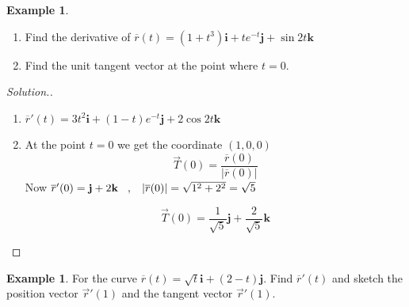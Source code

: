 \documentclass[11pt,a4paper]{article}
\theoremstyle{definition}
\newtheorem{exa}[thm]{Example}
\newenvironment{solution}
  {\renewcommand{\qedsymbol}{}\begin{proof}[\textit{Solution}.]}
  {\end{proof}}
\begin{document}
\begin{exa}
\begin{enumerate}
\item Find the derivative of $\overline{r}(t) = (1 + t^3)\textbf{i} +\displaystyle{ te^{-t}\textbf{j}} + \sin 2t \textbf{k}$
\item Find the unit tangent vector at the point where $t = 0$.
\end{enumerate}
\end{exa}

\begin{solution}
\begin{enumerate}
\item $\displaystyle{\overline{r}'(t) = 3t^2\textbf{i} + (1-t)e^{-t}\textbf{j} + 2\cos 2t \textbf{k}}$
\item At the point $t = 0$ we get the coordinate $(1,0,0)$
$$\displaystyle{\overrightarrow{T}(0) = \frac{\overline{r}(0)}{\left|\overline{r}(0)\right|
}}$$ 
Now $\overline{r}'(0) = \textbf{j} + 2\textbf{k}\hspace{0.3cm}, \hspace{0.3cm} \left|\overline{r}(0)\right| = \sqrt{1^2 + 2^2} = \sqrt{5}$

$$\overrightarrow{T}(0) = \frac{1}{\sqrt{5}}\textbf{j} + \frac{2}{\sqrt{5}}\textbf{k}$$
\end{enumerate}
\end{solution}

\begin{exa}


For the curve $\overline{r}(t) = \sqrt{t}\textbf{i} + (2 - t)\textbf{j}$. Find $\overline{r}'(t)$ and sketch the position vector $\overrightarrow{r}'(1)$ and the tangent vector $\overrightarrow{r}'(1)$.
\end{exa}
\end{document}
